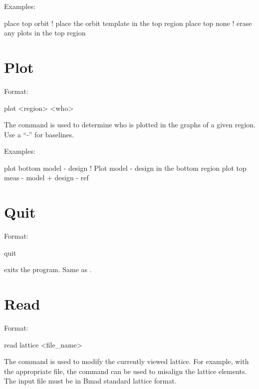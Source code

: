 Examples:
\begin{example}
  place top orbit  ! place the orbit template in the top region
  place top none   ! erase any plots in the top region
\end{example}

\section{Plot}
\label{s:plot}

Format:
\begin{example}
  plot <region> <who>
\end{example}

\vskip 0.2in 
The  command is used to determine who is plotted
in the graphs of a given region. Use a ``-'' for baselines. 

Examples:
\begin{example}
  plot bottom model - design       ! Plot model - design in the bottom region
  plot top meas - model + design - ref 
\end{example}

\section{Quit}
\label{s:quit}

Format:
\begin{example}
  quit
\end{example}

\vskip 0.2in
 exits the program. Same as .

\section{Read}
\label{s:read}

Format:
\begin{example}
  read lattice <file_name>
\end{example}

\vskip 0.2in 
The  command is used to modify the currently
viewed  lattice. For example, with the appropriate file,
the  command can be used to misalign the lattice
elements. The input file must be in Bmad standard lattice format.

